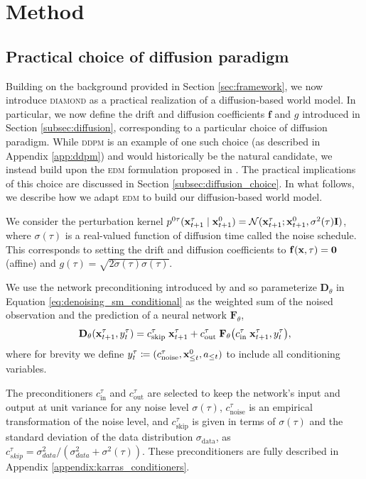 \section{Method}
\label{sec:method}

\subsection{Practical choice of diffusion paradigm}
\label{subsec:practical_dwm}

Building on the background provided in Section \ref{sec:framework}, we now introduce \textsc{diamond} as a practical realization of a diffusion-based world model. In particular, we now define the drift and diffusion coefficients $\mathbf{f}$ and $g$ introduced in Section \ref{subsec:diffusion}, corresponding to a particular choice of diffusion paradigm. While \textsc{ddpm} \citep{ho2020DDPM} is an example of one such choice (as described in Appendix \ref{app:ddpm}) and would historically be the natural candidate, we instead build upon the \textsc{edm} formulation proposed in \citet{karras2022elucidating}. The practical implications of this choice are discussed in Section \ref{subsec:diffusion_choice}. In what follows, we describe how we adapt \textsc{edm} to build our diffusion-based world model.

We consider the perturbation kernel $p^{0\tau}(\mathbf{x}_{t+1}^\tau \mid \mathbf{x}_{t+1}^0) = \mathcal{N}(\mathbf{x}_{t+1}^\tau; \mathbf{x}_{t+1}^0, \sigma^2(\tau) \mathbf{I})$, where $\sigma(\tau)$ is a real-valued function of diffusion time called the noise schedule. This corresponds to setting the drift and diffusion coefficients to $\mathbf{f}(\mathbf{x}, \tau) = \mathbf{0}$ (affine) and $g(\tau) = \sqrt{2 \dot \sigma(\tau) \sigma(\tau)}$.

We use the network preconditioning introduced by \citet{karras2022elucidating} and so parameterize $\mathbf{D}_\theta$ in Equation \ref{eq:denoising_sm_conditional} as the weighted sum of the noised observation and the prediction of a neural network $\mathbf{F}_\theta$,
\begin{equation}
\label{eq:karras_wrappers} 
    \mathbf{D}_\theta(\mathbf{x}_{t+1}^\tau, y_t^\tau) = c_\text{skip}^\tau \; \mathbf{x}_{t+1}^\tau + c_\text{out}^\tau \; \mathbf{F}_\theta \big( c_\text{in}^\tau \; \mathbf{x}_{t+1}^\tau, y_t^\tau \big),
\end{equation}
where for brevity we define $y_t^\tau \coloneqq (c_\text{noise}^\tau, \mathbf{x}^0_{\le t}, a_{\le t})$ to include all conditioning variables.

The preconditioners $c_\text{in}^\tau$ and $c_\text{out}^\tau$ are selected to keep the network's input and output at unit variance for any noise level $\sigma(\tau)$, $c_\text{noise}^\tau$ is an empirical transformation of the noise level, and $c_\text{skip}^\tau$ is given in terms of $\sigma(\tau)$ and the standard deviation of the data distribution $\sigma_\text{data}$, as $c_{skip}^\tau = \sigma_{data}^2/(\sigma_{data}^2 + \sigma^2(\tau))$. These preconditioners are fully described in Appendix \ref{appendix:karras_conditioners}.

